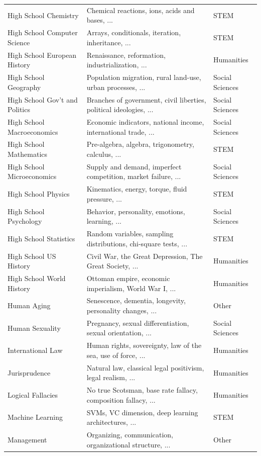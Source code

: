 \documentclass{article}
\begin{document}
\begin{table}[h]
{\begin{tabular}{lll}
High School Chemistry & Chemical reactions, ions, acids and bases, ... & STEM \\
High School Computer Science & Arrays, conditionals, iteration, inheritance, ... & STEM \\
High School European History & Renaissance, reformation, industrialization, ... & Humanities \\
High School Geography & Population migration, rural land-use, urban processes, ... & Social Sciences \\
High School Gov't and Politics & Branches of government, civil liberties, political ideologies, ... & Social Sciences \\
High School Macroeconomics & Economic indicators, national income, international trade, ... & Social Sciences \\
High School Mathematics & Pre-algebra, algebra, trigonometry, calculus, ... & STEM \\
High School Microeconomics & Supply and demand, imperfect competition, market failure, ... & Social Sciences \\
High School Physics & Kinematics, energy, torque, fluid pressure, ... & STEM \\
High School Psychology & Behavior, personality, emotions, learning, ... & Social Sciences \\
High School Statistics & Random variables, sampling distributions, chi-square tests, ...  & STEM \\
High School US History & Civil War, the Great Depression, The Great Society, ... & Humanities \\
High School World History & Ottoman empire, economic imperialism, World War I, ... & Humanities \\
Human Aging & Senescence, dementia, longevity, personality changes, ... & Other \\
Human Sexuality & Pregnancy, sexual differentiation, sexual orientation, ... & Social Sciences \\
International Law & Human rights, sovereignty, law of the sea, use of force, ... & Humanities \\
Jurisprudence & Natural law, classical legal positivism, legal realism, ... & Humanities \\
Logical Fallacies & No true Scotsman, base rate fallacy, composition fallacy, ... & Humanities \\
Machine Learning & SVMs, VC dimension, deep learning architectures, ... & STEM \\
Management & Organizing, communication, organizational structure, ... & Other \\

\end{tabular}}
\end{table}
\end{document}
